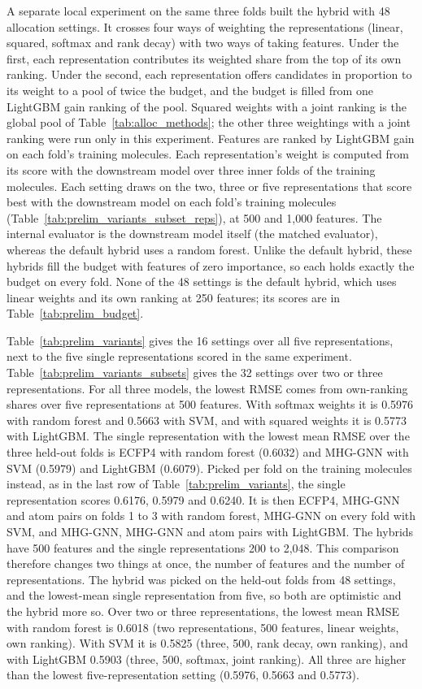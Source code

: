 A separate local experiment on the same three folds built the hybrid with 48 allocation settings. It crosses four ways of weighting the representations (linear, squared, softmax and rank decay) with two ways of taking features. Under the first, each representation contributes its weighted share from the top of its own ranking. Under the second, each representation offers candidates in proportion to its weight to a pool of twice the budget, and the budget is filled from one LightGBM gain ranking of the pool. Squared weights with a joint ranking is the global pool of Table~\ref{tab:alloc_methods}; the other three weightings with a joint ranking were run only in this experiment. Features are ranked by LightGBM gain on each fold's training molecules. Each representation's weight is computed from its score with the downstream model over three inner folds of the training molecules. Each setting draws on the two, three or five representations that score best with the downstream model on each fold's training molecules (Table~\ref{tab:prelim_variants_subset_reps}), at 500 and 1,000 features. The internal evaluator is the downstream model itself (the matched evaluator), whereas the default hybrid uses a random forest. Unlike the default hybrid, these hybrids fill the budget with features of zero importance, so each holds exactly the budget on every fold. None of the 48 settings is the default hybrid, which uses linear weights and its own ranking at 250 features; its scores are in Table~\ref{tab:prelim_budget}.

Table~\ref{tab:prelim_variants} gives the 16 settings over all five representations, next to the five single representations scored in the same experiment. Table~\ref{tab:prelim_variants_subsets} gives the 32 settings over two or three representations. For all three models, the lowest RMSE comes from own-ranking shares over five representations at 500 features. With softmax weights it is 0.5976 with random forest and 0.5663 with SVM, and with squared weights it is 0.5773 with LightGBM. The single representation with the lowest mean RMSE over the three held-out folds is ECFP4 with random forest (0.6032) and MHG-GNN with SVM (0.5979) and LightGBM (0.6079). Picked per fold on the training molecules instead, as in the last row of Table~\ref{tab:prelim_variants}, the single representation scores 0.6176, 0.5979 and 0.6240. It is then ECFP4, MHG-GNN and atom pairs on folds 1 to 3 with random forest, MHG-GNN on every fold with SVM, and MHG-GNN, MHG-GNN and atom pairs with LightGBM. The hybrids have 500 features and the single representations 200 to 2,048. This comparison therefore changes two things at once, the number of features and the number of representations. The hybrid was picked on the held-out folds from 48 settings, and the lowest-mean single representation from five, so both are optimistic and the hybrid more so. Over two or three representations, the lowest mean RMSE with random forest is 0.6018 (two representations, 500 features, linear weights, own ranking). With SVM it is 0.5825 (three, 500, rank decay, own ranking), and with LightGBM 0.5903 (three, 500, softmax, joint ranking). All three are higher than the lowest five-representation setting (0.5976, 0.5663 and 0.5773).

